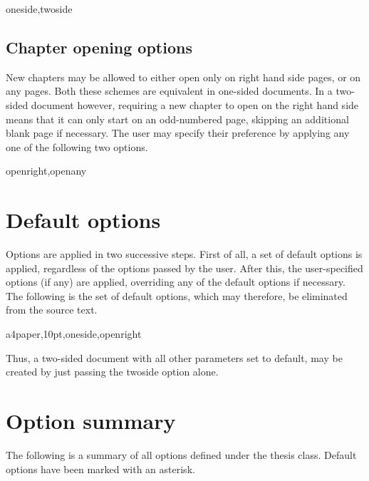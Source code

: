 \documentclass[twoside,openany]{thesis}
\begin{document}
{\ttfamily oneside,twoside}

\subsection{Chapter opening options}\label{subsec:Chapter opening options}

New chapters may be allowed to either open only on right hand side pages, or on any pages.
Both these schemes are equivalent in one-sided documents.
In a two-sided document however, requiring a new chapter to open on the right hand side means that it can only start on an odd-numbered page, skipping an additional blank page if necessary.
The user may specify their preference by applying any one of the following two options.

{\ttfamily openright,openany}

\section{Default options}\label{sec:Default options}

Options are applied in two successive steps.
First of all, a set of default options is applied, regardless of the options passed by the user.
After this, the user-specified options (if any) are applied, overriding any of the default options if necessary.
The following is the set of default options, which may therefore, be eliminated from the source text.

{\ttfamily a4paper,10pt,oneside,openright}

Thus, a two-sided document with all other parameters set to default, may be created by just passing the {\ttfamily twoside} option alone.

\section{Option summary}\label{sec:Option summary}

The following is a summary of all options defined under the {\ttfamily thesis} class.
Default options have been marked with an asterisk.
\end{document}
